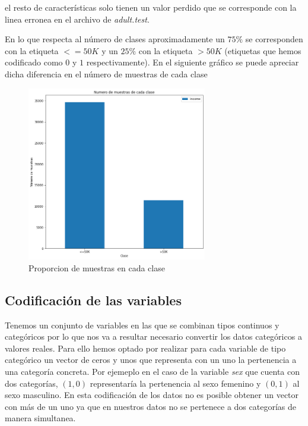 \documentclass[a4paper,11pt]{article}
\begin{document}
el resto de características solo tienen un valor perdido que se corresponde 
con la linea erronea en el archivo de \textit{adult.test}.

En lo que respecta al número de clases aproximadamente un $75\%$ se corresponden 
con la etiqueta $<=50K$ y un $25\%$ con la etiqueta $>50K$ (etiquetas que hemos
codificado como $0$ y $1$ respectivamente). En el siguiente gráfico se puede apreciar 
dicha diferencia en el número de muestras de cada clase 

\begin{figure}[h!]
    \centering
    \includegraphics[width=0.7\textwidth]{images/proportion}
    \caption{Proporcion de muestras en cada clase}
\end{figure}


\subsection{Codificación de las variables}

Tenemos un conjunto de variables en las que se combinan tipos continuos y
categóricos por lo que nos va a resultar necesario convertir los datos
categóricos a valores reales. Para ello hemos optado por realizar para cada
variable de tipo categórico un vector de ceros y unos que representa con un uno
la pertenencia a una categoría concreta. Por ejemeplo en el caso de la variable
\textit{sex} que cuenta con dos categorías, $(1,0)$ representaría la pertenencia
al sexo femenino y $(0,1)$ al sexo masculino. En esta codificación de los datos
no es posible obtener un vector con más de un uno ya que en nuestros datos no se
pertenece a dos categorías de manera simultanea.
\end{document}
